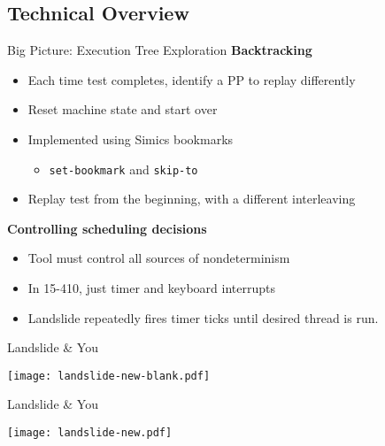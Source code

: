\documentclass[xcolor=dvipsnames]{beamer}
\begin{document}

\subsection{Technical Overview}

\begin{frame}{Big Picture: Execution Tree Exploration}
	\textbf{Backtracking}
	\begin{itemize}
		\item Each time test completes, identify a PP to replay differently
		\item Reset machine state and start over
		\item Implemented using Simics bookmarks
			\begin{itemize}
				\item {\tt set-bookmark} and {\tt skip-to}
			\end{itemize}
		\item Replay test from the beginning, with a different interleaving
	\end{itemize}
	\pause
	\linegap

	{\bf Controlling scheduling decisions}
	\begin{itemize}
		\item Tool must control all sources of nondeterminism
		\item In 15-410, just timer and keyboard interrupts
		\item Landslide repeatedly fires timer ticks until desired thread is run.
	\end{itemize}
\end{frame}

\begin{frame}{Landslide \& You}
	\begin{center}
	\texttt{[image: landslide-new-blank.pdf]}
	\end{center}
\end{frame}

\begin{frame}{Landslide \& You}
	\begin{center}
	\texttt{[image: landslide-new.pdf]}
	\end{center}
\end{frame}
\end{document}

